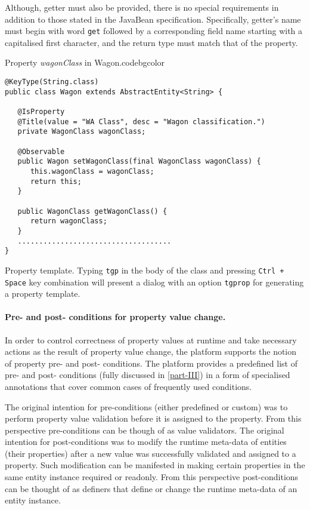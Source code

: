   Although, getter must also be provided, there is no special requirements in addition to those stated in the JavaBean specification.
  Specifically, getter's name must begin with word \texttt{get} followed by a corresponding field name starting with a capitalised first character, and the return type must match that of the property.

  \begin{code}{Property \emph{wagonClass} in Wagon.}{\label{lst:WagonWagonClassProperty}}{codebgcolor}
    \begin{lstlisting}
@KeyType(String.class)
public class Wagon extends AbstractEntity<String> {

   @IsProperty
   @Title(value = "WA Class", desc = "Wagon classification.")
   private WagonClass wagonClass;

   @Observable
   public Wagon setWagonClass(final WagonClass wagonClass) {
      this.wagonClass = wagonClass;
      return this;
   }
  
   public WagonClass getWagonClass() {
      return wagonClass;
   }
   ....................................
}
    \end{lstlisting}
  \end{code}


  \begin{notebox}{Property template.}{\label{nb:EclipseTemplatesForProperty}}
    Typing \texttt{tgp} in the body of the class and pressing \texttt{Ctrl + Space} key combination will present a dialog with an option \texttt{tgprop} for generating a property template.
  \end{notebox}

  \paragraph*{Pre- and post- conditions for property value change.}
  
  In order to control correctness of property values at runtime and take necessary actions as the result of property value change, the platform supports the notion of property pre- and post- conditions.
  The platform provides a predefined list of pre- and post- conditions (fully discussed in \ref{part-III}) in a form of specialised annotations that cover common cases of frequently used conditions.
  
  The original intention for pre-conditions (either predefined or custom) was to perform property value validation before it is assigned to the property.
  From this perspective pre-conditions can be though of as value validators.
  The original intention for post-conditions was to modify the runtime meta-data of entities (their properties) after a new value was successfully validated and assigned to a property.
  Such modification can be manifested in making certain properties in the same entity instance required or readonly.
  From this perspective post-conditions can be thought of as definers that define or change the runtime meta-data of an entity instance.
  
